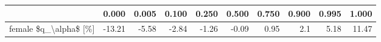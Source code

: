 \begin{tabular}{lrrrrrrrrr}
\toprule
{} &  0.000 &  0.005 &  0.100 &  0.250 &  0.500 &  0.750 &  0.900 &  0.995 &  1.000 \\
\midrule
female \$q\_\textbackslash alpha\$ [\%] & -13.21 &  -5.58 &  -2.84 &  -1.26 &  -0.09 &   0.95 &    2.1 &   5.18 &  11.47 \\
\bottomrule
\end{tabular}
